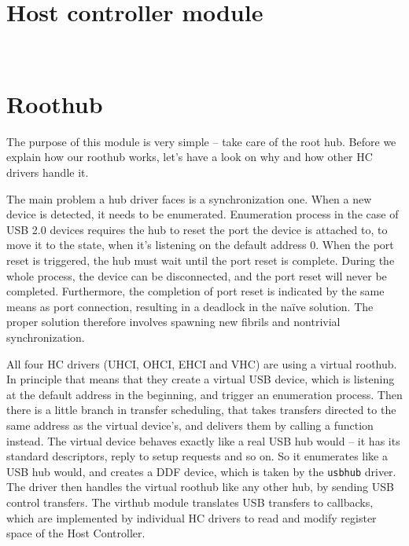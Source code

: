 


\section{Host controller module}

\
\section{Roothub}

The purpose of this module is very simple -- take care of the root hub. Before
we explain how our roothub works, let's have a look on why and how other HC
drivers handle it.

The main problem a hub driver faces is a synchronization one. When a new device
is detected, it needs to be enumerated. Enumeration process in the case of USB 2.0
devices requires the hub to reset the port the device is attached to, to move
it to the \state{Default} state, when it's listening on the default address 0.
When the port reset is triggered, the hub must wait until the port reset is
complete. During the whole process, the device can be disconnected, and the
port reset will never be completed. Furthermore, the completion of port reset
is indicated by the same means as port connection, resulting in a deadlock in
the na\"ive solution. The proper solution therefore involves spawning new
fibrils and nontrivial synchronization.

All four HC drivers (UHCI, OHCI, EHCI and VHC) are using a virtual roothub. In
principle that means that they create a virtual USB device, which is listening
at the default address in the beginning, and trigger an enumeration process.
Then there is a little branch in transfer scheduling, that takes transfers
directed to the same address as the virtual device's, and delivers them by
calling a function instead. The virtual device behaves exactly like a real USB
hub would -- it has its standard descriptors, reply to setup requests and so
on. So it enumerates like a USB hub would, and creates a DDF device, which is
taken by the \texttt{usbhub} driver. The driver then handles the virtual
roothub like any other hub, by sending USB control transfers. The virthub
module translates USB transfers to callbacks, which are implemented by
individual HC drivers to read and modify register space of the Host Controller.

